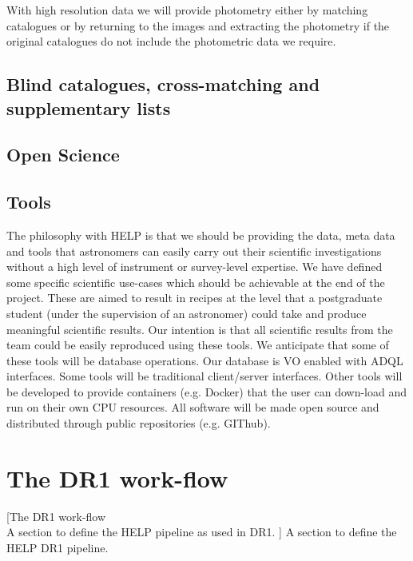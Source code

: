 \documentclass[usenatbib]{mnras}
\begin{document}
With high resolution data we will provide photometry either by matching
catalogues or by returning to the images and extracting the photometry if the
original catalogues do not include the photometric data we require.
\subsection[Blind catalogues, cross-matching and supplementary lists\\{\color{red}Some of this should go into the strategy as it is not implemented in DR1, but this is where to discuss the blind SPIRE catalogues that Steven has produced, plus spec-z catalogues, radio catalogues?}]{Blind catalogues, cross-matching and supplementary lists}

\subsection[Open Science]{Open Science}
\subsection{Tools}

The philosophy with HELP is that we should be providing the data, meta data and
tools that astronomers can easily carry out their scientific investigations
without a high level of instrument or survey-level expertise.  We have defined
some specific scientific use-cases which should be achievable at the end of the
project.  These are aimed to result in recipes at the level  that a postgraduate
student (under the supervision of an astronomer) could take and produce
meaningful scientific results.  Our intention is that all scientific results
from the team could be easily reproduced using these tools.  We anticipate that
some of these tools will be database operations.  Our database is VO enabled
with ADQL interfaces.  Some tools will be traditional client/server interfaces.
Other tools will be developed to provide containers (e.g. Docker) that the user
can down-load and run on their own CPU resources.  All software will be made
open source and distributed through public repositories (e.g. GIThub).

\section{The DR1 work-flow}[The DR1 work-flow\\{\color{red} A section to define the HELP pipeline as used in DR1.  }]
{\color{red} A section to define the HELP DR1 pipeline.  }
\end{document}
